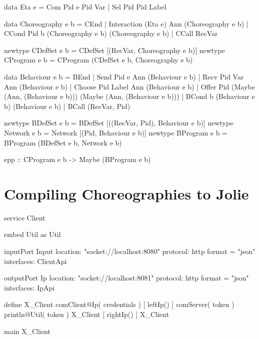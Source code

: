 \documentclass[runningheads]{llncs}
\begin{document}
\begin{haskelllisting}
data Eta e
  = Com Pid e Pid Var
  | Sel Pid Pid Label

data Choreography e b
  = CEnd
  | Interaction (Eta e) Ann (Choreography e b)
  | CCond Pid b (Choreography e b) (Choreography e b)
  | CCall RecVar

newtype CDefSet e b = CDefSet [(RecVar, Choreography e b)]
newtype CProgram e b = CProgram (CDefSet e b, Choreography e b)

data Behaviour e b
  = BEnd
  | Send Pid e Ann (Behaviour e b)
  | Recv Pid Var Ann (Behaviour e b)
  | Choose Pid Label Ann (Behaviour e b)
  | Offer Pid (Maybe (Ann, (Behaviour e b))) (Maybe (Ann, (Behaviour e b)))
  | BCond b (Behaviour e b) (Behaviour e b)
  | BCall (RecVar, Pid)

newtype BDefSet e b = BDefSet [((RecVar, Pid), Behaviour e b)]
newtype Network e b = Network [(Pid, Behaviour e b)]
newtype BProgram e b = BProgram (BDefSet e b, Network e b)

epp :: CProgram e b -> Maybe (BProgram e b)
\end{haskelllisting}

\section{Compiling Choreographies to Jolie}
\label{sec:jolie}

\begin{jolielisting}
service Client {
  embed Util as Util

  inputPort Input {
    location: "socket://localhost:8080"
    protocol: http { format = "json" }
    interfaces: ClientApi
  }

  outputPort Ip {
    location: "socket://localhost:8081"
    protocol: http { format = "json" }
    interfaces: IpApi
  }

  define X_Client {
    comClient@Ip( credentials )
    [ leftIp() ] {
      comServer( token )
      println@Util( token )
      X_Client
    }
    [ rightIp() ] {
      X_Client
    }
  }

  main {
    X_Client
  }
}
\end{jolielisting}


\end{document}
